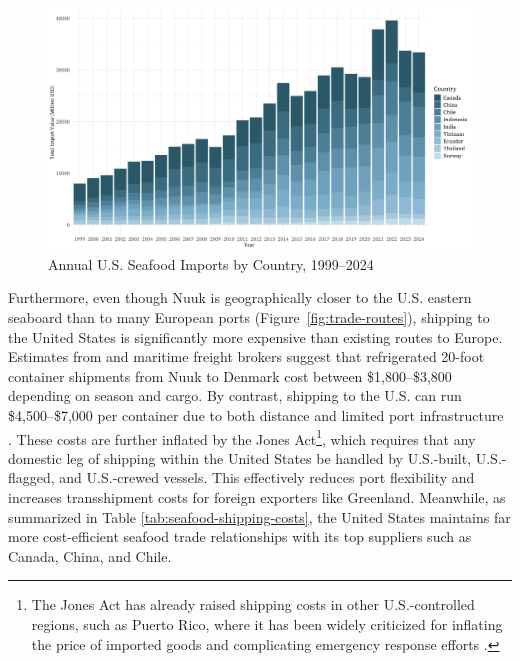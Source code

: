 \documentclass{adonis}
\begin{document}
    \begin{figure}[H]
        \centering
        \includegraphics[width=0.90\linewidth]{seafood_imports_by_country.png}
        \caption{Annual U.S. Seafood Imports by Country, 1999–2024 \citep{usda2025foodimports}}
        \label{fig:seafood-imports}
    \end{figure}
    
    Furthermore, even though Nuuk is geographically closer to the U.S. eastern seaboard than to many European ports (Figure~\ref{fig:trade-routes}), shipping to the United States is significantly more expensive than existing routes to Europe. Estimates from \citet{royalarcticline2024freight} and maritime freight brokers suggest that refrigerated 20-foot container shipments from Nuuk to Denmark cost between \$1,800–\$3,800 depending on season and cargo. By contrast, shipping to the U.S. can run \$4,500–\$7,000 per container due to both distance and limited port infrastructure \citep{intlvanlines2024shipping}. These costs are further inflated by the Jones Act\footnote{The Jones Act has already raised shipping costs in other U.S.-controlled regions, such as Puerto Rico, where it has been widely criticized for inflating the price of imported goods and complicating emergency response efforts \citep{rivera2018hard}.}, which requires that any domestic leg of shipping within the United States be handled by U.S.-built, U.S.-flagged, and U.S.-crewed vessels. This effectively reduces port flexibility and increases transshipment costs for foreign exporters like Greenland. Meanwhile, as summarized in Table \ref{tab:seafood-shipping-costs}, the United States maintains far more cost-efficient seafood trade relationships with its top suppliers such as Canada, China, and Chile. 
\end{document}
